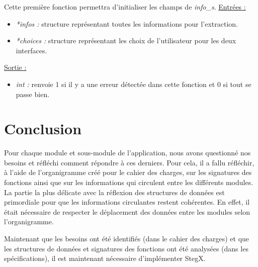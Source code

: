 \documentclass[11pt]{article}
\begin{document}
Cette première fonction permettra d'initialiser les champs de \textit{info\_s}.
\newline
\underline{Entrées :} 
\begin{itemize}
\item \textit{*infos :} structure représentant toutes les informations pour 
l'extraction.  
\item \textit{*choices :} structure représentant les choix de 
l'utilisateur pour les deux interfaces. 
\end{itemize}
\underline{Sortie :} 
\begin{itemize}
\item \textit{int :} renvoie 1 si il y a une erreur détectée dans cette 
fonction et 0 si tout se passe bien.  
\newline 
\end{itemize}


\section{Conclusion}

Pour chaque module et sous-module de l'application, nous avons questionné nos 
besoins et réfléchi comment répondre à ces derniers. Pour cela, il a fallu 
réfléchir, à l'aide de l'organigramme créé pour le cahier des charges, 
sur les signatures des fonctions ainsi que sur les informations qui circulent 
entre les différents modules. 
La partie la plus délicate avec la réflexion des structures de données 
est primordiale pour que les informations circulantes restent cohérentes. 
En effet, il était nécessaire de respecter le déplacement des données entre 
les modules selon l'organigramme. 

Maintenant que les besoins ont été identifiés (dans le cahier des charges) 
et que les structures de données et signatures des fonctions ont été 
analysées (dans les spécifications), il est maintenant nécessaire 
d'implémenter StegX. 
\end{document}
